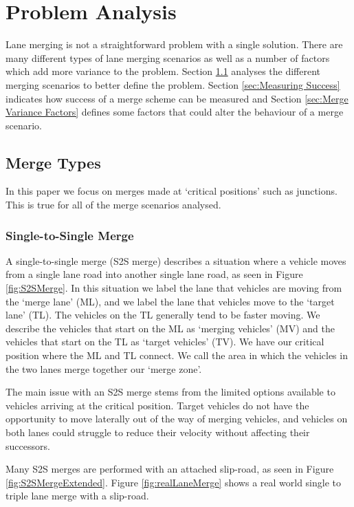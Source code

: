 \chapter{Problem Analysis}
\label{cha:Problem Analysis}
Lane merging is not a straightforward problem with a single solution. There are many different types of lane merging scenarios as well as a number of factors which add more variance to the problem. Section \ref{sec:Merge Types} analyses the different merging scenarios to better define the problem. Section \ref{sec:Measuring Success} indicates how success of a merge scheme can be measured and Section \ref{sec:Merge Variance Factors} defines some factors that could alter the behaviour of a merge scenario.

\section{Merge Types}
\label{sec:Merge Types}
In this paper we focus on merges made at `critical positions' such as junctions. This is true for all of the merge scenarios analysed.

\subsection{Single-to-Single Merge}
\label{subsec:Single-to-Single Merge}
A single-to-single merge (S2S merge) describes a situation where a vehicle moves from a single lane road into another single lane road, as seen in Figure \ref{fig:S2SMerge}. In this situation we label the lane that vehicles are moving from the `merge lane' (ML), and we label the lane that vehicles move to the `target lane' (TL). The vehicles on the TL generally tend to be faster moving. We describe the vehicles that start on the ML as `merging vehicles' (MV) and the vehicles that start on the TL as `target vehicles' (TV). We have our critical position where the ML and TL connect. We call the area in which the vehicles in the two lanes merge together our `merge zone'.

The main issue with an S2S merge stems from the limited options available to vehicles arriving at the critical position. Target vehicles do not have the opportunity to move laterally out of the way of merging vehicles, and vehicles on both lanes could struggle to reduce their velocity without affecting their successors.

Many S2S merges are performed with an attached slip-road, as seen in Figure \ref{fig:S2SMergeExtended}. Figure \ref{fig:realLaneMerge} shows a real world single to triple lane merge with a slip-road.


